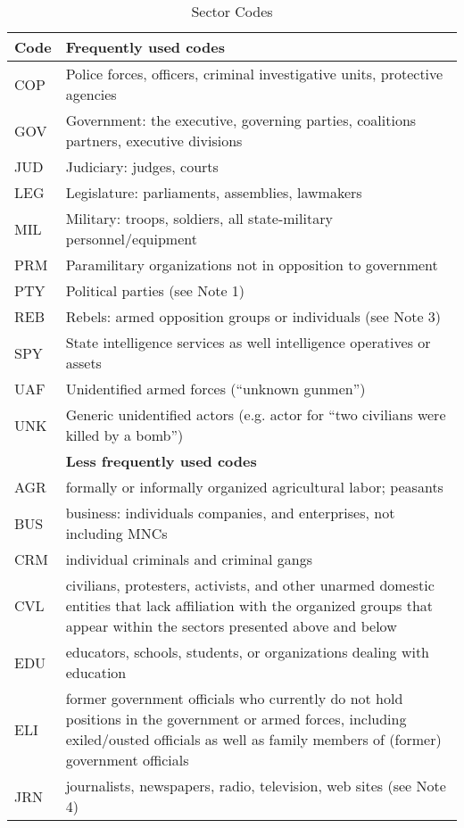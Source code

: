 \documentclass[11pt]{report}
\begin{document}
\begin{center}
\begin{longtable}{|l|p{13cm}|}
\caption{Sector Codes}
\label{tab:roles}
 \\ \cline{1-2}
  \textbf{Code} & \textbf{Frequently used codes}\\
  \hline
	  COP & Police forces, officers, criminal investigative units, protective agencies \\
      GOV & Government: the executive, governing parties, coalitions partners, executive divisions \\
	  JUD & Judiciary: judges, courts \\
	  LEG & Legislature: parliaments, assemblies, lawmakers \\
	  MIL & Military: troops, soldiers, all state-military personnel/equipment\\
	  PRM & Paramilitary organizations not in opposition to government\\
	  PTY & Political parties (see Note 1) \\
	  REB & Rebels: armed opposition groups or individuals (see Note 3)\\
	  SPY & State intelligence services as well intelligence operatives or assets \\
	  UAF & Unidentified armed forces (``unknown gunmen'') \\
	  UNK & Generic unidentified actors (e.g. actor for ``two civilians were killed by a bomb'') \\
  \hline
~   & \textbf{Less frequently used codes}\\
 \hline
 	  AGR & formally or informally organized agricultural labor; peasants \\
      BUS & business: individuals companies, and enterprises, not including MNCs \\
      CRM & individual criminals and criminal gangs \\
	  CVL & civilians, protesters, activists, and other unarmed domestic entities that lack affiliation with the organized groups that appear within the sectors presented above and below  \\
	  EDU & educators, schools, students, or organizations dealing with education \\
      ELI & former government officials who currently do not hold positions in the government or armed forces, including exiled/ousted officials as well as family members of (former) government officials\\
      JRN & journalists, newspapers, radio, television, web sites (see Note 4)  \\

\end{longtable}
\end{center}
\end{document}
